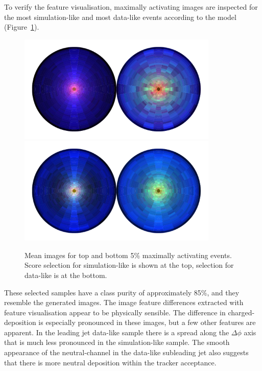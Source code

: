To verify the feature visualisation, maximally activating images are inspected for the most simulation-like and most data-like events according to the model (Figure~\ref{fig:event_categorisation:zee_data_sim_max_act}). 
\begin{figure}[h!]
    \begin{center}
        \includegraphics[width=0.85\textwidth]{figures/event_selection/zee_max_act_mean_sim.pdf}
        \includegraphics[width=0.85\textwidth]{figures/event_selection/zee_max_act_mean_data.pdf}
    \end{center}
    \caption{Mean images for top and bottom 5\% maximally activating events. 
             Score selection for simulation-like is shown at the top, selection for data-like is at the bottom.}
    \label{fig:event_categorisation:zee_data_sim_max_act}
\end{figure}

These selected samples have a class purity of approximately 85\%, and they resemble the generated images. The image feature differences extracted with feature visualisation appear to be physically sensible. 
The difference in charged-\pt deposition is especially pronounced in these images, but a few other features are apparent. In the leading jet data-like sample there is a spread along the $\Delta\phi$ axis that is much less pronounced in the simulation-like sample. 
The smooth appearance of the neutral-\pt channel in the data-like subleading jet also suggests that there is more neutral deposition within the tracker acceptance. 



